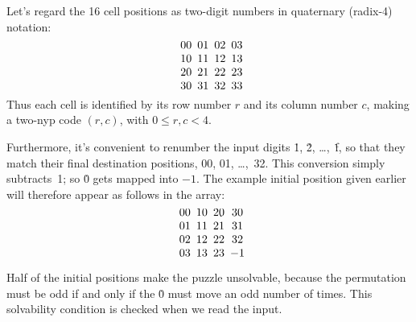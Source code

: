 Let's regard the 16 cell positions as two-digit numbers in quaternary
(radix-4) notation:
$$\vcenter{\halign{&\enspace#\cr
00&01&02&03\cr
10&11&12&13\cr
20&21&22&23\cr
30&31&32&33\cr
}}$$
Thus each cell is identified by its row number $r$ and its column number $c$,
making a two-nyp code $(r,c)$, with $0\le r,c<4$.

Furthermore, it's convenient to renumber the input digits \.1, \.2,
\dots,~\.f, so that they match their final destination positions,
00, 01, \dots,~32. This conversion simply subtracts~1; so \.0 gets
mapped into $-1$. The example initial position given earlier
will therefore appear as follows in the  array:
$$\vcenter{\halign{&\enspace$\hfil#\hfil$\cr
00&10&20&30\cr
01&11&21&31\cr
02&12&22&32\cr
03&13&23&-1\cr
}}$$

Half of the initial positions make the puzzle unsolvable, because the
permutation must be odd if and only if the \.0 must move an odd number of
times. This solvability condition is checked when we read the input.

